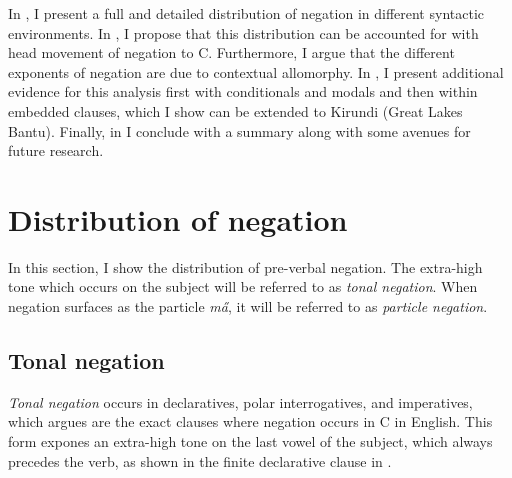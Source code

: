 \documentclass[output=paper,colorlinks,citecolor=brown,
]{langscibook}
\begin{document}
In , I present a full and detailed distribution of negation in different syntactic environments. In , I propose that this distribution can be accounted for with head movement of negation to C\xhead{}. Furthermore, I argue that the different exponents of negation are due to contextual allomorphy. In , I present additional evidence for this analysis first with conditionals and modals and then within embedded clauses, which I show can be extended to Kirundi (Great Lakes Bantu). Finally, in  I conclude with a summary along with some avenues for future research.

%
%

\section{Distribution of negation}\label{negation}

In this section, I show the distribution of pre-verbal negation. The extra-high tone which occurs on the subject will be referred to as \textit{tonal negation}. When negation surfaces as the particle \textit{m\H{a}}, it will be referred to as \textit{particle negation}.

\subsection{Tonal negation}

\textit{Tonal negation} occurs in declaratives, polar interrogatives, and imperatives, which \citet{potsdam2013cp} argues are the exact clauses where negation occurs in C in English. This form expones an extra-high tone on the last vowel of the subject, which always precedes the verb, as shown in the finite declarative clause in .
\end{document}
